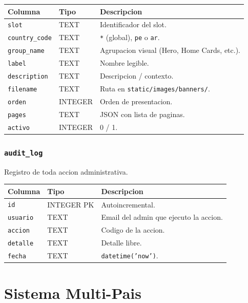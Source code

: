 \documentclass[11pt,a4paper]{article}
\begin{document}
\begin{longtable}{p{3.5cm} p{2cm} p{8cm}}
\toprule
\textbf{Columna} & \textbf{Tipo} & \textbf{Descripcion} \\
\midrule
\endhead
\texttt{slot}          & TEXT       & Identificador del slot. \\
\texttt{country\_code} & TEXT       & \texttt{*} (global), \texttt{pe} o \texttt{ar}. \\
\texttt{group\_name}   & TEXT       & Agrupacion visual (Hero, Home Cards, etc.). \\
\texttt{label}         & TEXT       & Nombre legible. \\
\texttt{description}   & TEXT       & Descripcion / contexto. \\
\texttt{filename}      & TEXT       & Ruta en \texttt{static/images/banners/}. \\
\texttt{orden}         & INTEGER    & Orden de presentacion. \\
\texttt{pages}         & TEXT       & JSON con lista de paginas. \\
\texttt{activo}        & INTEGER    & 0 / 1. \\
\bottomrule
\end{longtable}

\subsubsection{\texttt{audit\_log}}
Registro de toda accion administrativa.

\begin{longtable}{p{3cm} p{2cm} p{9cm}}
\toprule
\textbf{Columna} & \textbf{Tipo} & \textbf{Descripcion} \\
\midrule
\endhead
\texttt{id}      & INTEGER PK & Autoincremental. \\
\texttt{usuario} & TEXT       & Email del admin que ejecuto la accion. \\
\texttt{accion}  & TEXT       & Codigo de la accion. \\
\texttt{detalle} & TEXT       & Detalle libre. \\
\texttt{fecha}   & TEXT       & \texttt{datetime('now')}. \\
\bottomrule
\end{longtable}

\section{Sistema Multi-Pais}
\end{document}
